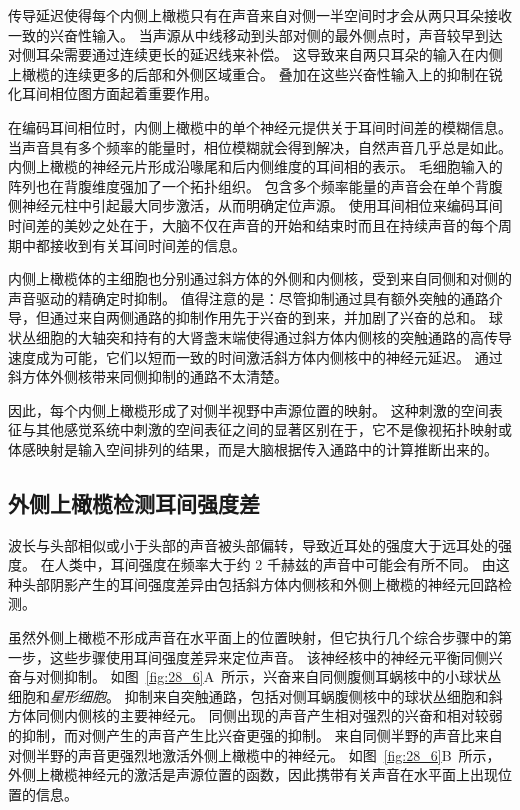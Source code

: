 传导延迟使得每个内侧上橄榄只有在声音来自对侧一半空间时才会从两只耳朵接收一致的兴奋性输入。
当声源从中线移动到头部对侧的最外侧点时，声音较早到达对侧耳朵需要通过连续更长的延迟线来补偿。
这导致来自两只耳朵的输入在内侧上橄榄的连续更多的后部和外侧区域重合。
叠加在这些兴奋性输入上的抑制在锐化耳间相位图方面起着重要作用。


在编码耳间相位时，内侧上橄榄中的单个神经元提供关于耳间时间差的模糊信息。
当声音具有多个频率的能量时，相位模糊就会得到解决，自然声音几乎总是如此。
内侧上橄榄的神经元片形成沿喙尾和后内侧维度的耳间相的表示。
毛细胞输入的阵列也在背腹维度强加了一个拓扑组织。
包含多个频率能量的声音会在单个背腹侧神经元柱中引起最大同步激活，从而明确定位声源。
使用耳间相位来编码耳间时间差的美妙之处在于，大脑不仅在声音的开始和结束时而且在持续声音的每个周期中都接收到有关耳间时间差的信息。


内侧上橄榄体的主细胞也分别通过斜方体的外侧和内侧核，受到来自同侧和对侧的声音驱动的精确定时抑制。
值得注意的是：尽管抑制通过具有额外突触的通路介导，但通过来自两侧通路的抑制作用先于兴奋的到来，并加剧了兴奋的总和。
球状丛细胞的大轴突和持有的大肾盏末端使得通过斜方体内侧核的突触通路的高传导速度成为可能，它们以短而一致的时间激活斜方体内侧核中的神经元延迟。
通过斜方体外侧核带来同侧抑制的通路不太清楚。


因此，每个内侧上橄榄形成了对侧半视野中声源位置的映射。
这种刺激的空间表征与其他感觉系统中刺激的空间表征之间的显著区别在于，它不是像视拓扑映射或体感映射是输入空间排列的结果，而是大脑根据传入通路中的计算推断出来的。



\subsection{外侧上橄榄检测耳间强度差}

波长与头部相似或小于头部的声音被头部偏转，导致近耳处的强度大于远耳处的强度。
在人类中，耳间强度在频率大于约 2 千赫兹的声音中可能会有所不同。
由这种头部阴影产生的耳间强度差异由包括斜方体内侧核和外侧上橄榄的神经元回路检测。


虽然外侧上橄榄不形成声音在水平面上的位置映射，但它执行几个综合步骤中的第一步，这些步骤使用耳间强度差异来定位声音。
该神经核中的神经元平衡同侧兴奋与对侧抑制。
如图~\ref{fig:28_6}A~所示，兴奋来自同侧腹侧耳蜗核中的小球状丛细胞和\textit{星形细胞}。
抑制来自突触通路，包括对侧耳蜗腹侧核中的球状丛细胞和斜方体同侧内侧核的主要神经元。
同侧出现的声音产生相对强烈的兴奋和相对较弱的抑制，而对侧产生的声音产生比兴奋更强的抑制。
来自同侧半野的声音比来自对侧半野的声音更强烈地激活外侧上橄榄中的神经元。
如图~\ref{fig:28_6}B~所示，外侧上橄榄神经元的激活是声源位置的函数，因此携带有关声音在水平面上出现位置的信息。


